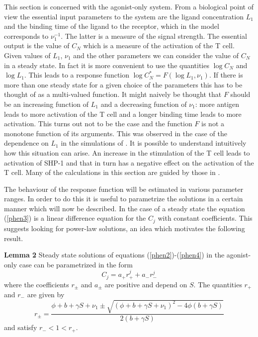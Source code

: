 \documentclass{article}
\begin{document}
This section is concerned with the agonist-only system. From a biological 
point of view the essential input parameters to the system are the ligand
concentration $L_1$ and the binding time of the ligand to the receptor, 
which in the model corresponds to $\nu_1^{-1}$. The latter is a measure of
the signal strength. The essential output is the value of $C_N$ which is 
a measure of the activation of the T cell. Given values of $L_1$, $\nu_1$ 
and the other parameters we can consider the value of $C_N$ in a steady 
state. In fact it is more convenient to use the quantities $\log C_N$ and
$\log L_1$. This leads to a response function $\log C^*_N=F(\log L_1,\nu_1)$. 
If there is more than one steady state for a given choice of the 
parameters this has to be thought of as a multi-valued function. It might 
naively be thought that $F$ should be an increasing function of $L_1$ and a 
decreasing function of $\nu_1$: more antigen leads to more activation of the T 
cell and a longer binding time leads to more activation. This turns out not to 
be the case and the function $F$ is not a monotone function of its arguments. 
This was observed in the case of the dependence on $L_1$ in the simulations of
\cite{francois13}. It is possible to understand intuitively how this 
situation can arise. An increase in the stimulation of the T cell leads to 
activation of SHP-1 and that in turn has a negative effect on the activation 
of the T cell. Many of the calculations in this section are guided by those in 
\cite{francois13}. 

The behaviour of the response function will be estimated in various parameter
ranges. In order to do this it is useful to parametrize the solutions in a 
certain manner which will now be described. In the case of a steady state the 
equation (\ref{phen3}) is a linear difference equation for the $C_j$ with 
constant coefficients. This suggests looking for power-law solutions, an
idea which motivates the following result.

\noindent
{\bf Lemma 2} Steady state solutions of equations (\ref{phen2})-(\ref{phen4})
in the agonist-only case can be parametrized in the form 
\begin{equation}\label{powerlaw}
C_j=a_+r_+^j+a_-r_-^j
\end{equation}
where the coefficients 
$r_{\pm}$ and $a_{\pm}$ are positive and depend on $S$. The quantities $r_+$ and
$r_-$ are given by 
\begin{equation}
r_{\pm}=\frac{\phi+b+\gamma S+\nu_1\pm\sqrt{(\phi+b+\gamma S+\nu_1)^2
-4\phi(b+\gamma S)}}{2(b+\gamma S)}\label{rpm}
\end{equation}
and satisfy $r_-<1<r_+$.
\end{document}
